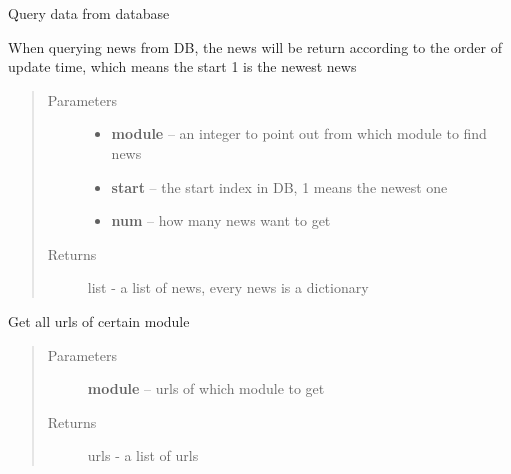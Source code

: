 \documentclass[letterpaper,10pt,english]{sphinxmanual}
\begin{document}
\begin{fulllineitems}
\label{sysunews:sysunews.api.get_news_fromDB}
Query data from database

When querying news from DB, the news will be return according to the order of update time, which means the start 1 is the newest news
\begin{quote}\begin{description}
\item[{Parameters}] \leavevmode\begin{itemize}
\item {} 
\textbf{module} -- an integer to point out from which module to find news

\item {} 
\textbf{start} -- the start index in DB, 1 means the newest one

\item {} 
\textbf{num} -- how many news want to get

\end{itemize}

\item[{Returns}] \leavevmode
list - a list of news, every news is a dictionary

\end{description}\end{quote}

\end{fulllineitems}


\begin{fulllineitems}
\label{sysunews:sysunews.api.get_news_urls}
Get all urls of certain module
\begin{quote}\begin{description}
\item[{Parameters}] \leavevmode
\textbf{module} -- urls of which module to get

\item[{Returns}] \leavevmode
urls - a list of urls

\end{description}\end{quote}

\end{fulllineitems}
\end{document}
